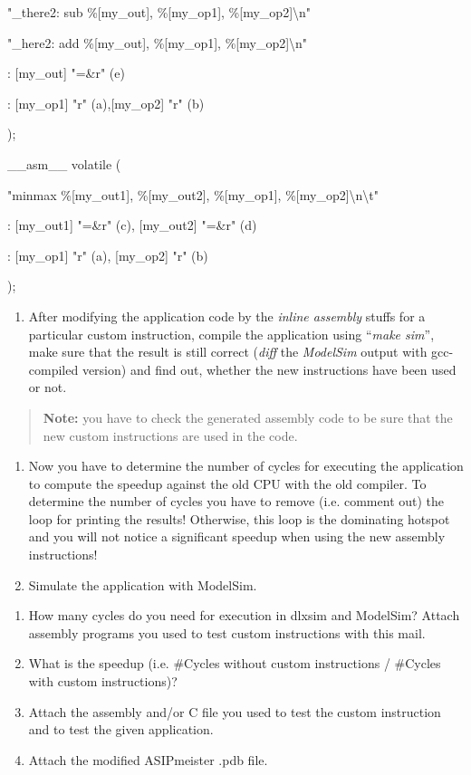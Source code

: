 \documentclass[
]{article}
\begin{document}
"\_there2: sub \%{[}my\_out{]}, \%{[}my\_op1{]},
\%{[}my\_op2{]}\textbackslash n"

"\_here2: add \%{[}my\_out{]}, \%{[}my\_op1{]},
\%{[}my\_op2{]}\textbackslash n"

: {[}my\_out{]} "=\&r" (e)

: {[}my\_op1{]} "r" (a),{[}my\_op2{]} "r" (b)

);

\_\_asm\_\_ volatile (

"minmax \%{[}my\_out1{]}, \%{[}my\_out2{]}, \%{[}my\_op1{]},
\%{[}my\_op2{]}\textbackslash n\textbackslash t"

: {[}my\_out1{]} "=\&r" (c), {[}my\_out2{]} "=\&r" (d)

: {[}my\_op1{]} "r" (a), {[}my\_op2{]} "r" (b)

);

\begin{enumerate}
\def\labelenumi{\arabic{enumi}.}
\setcounter{enumi}{3}
\item
  After modifying the application code by the \emph{inline assembly}
  stuffs for a particular custom instruction, compile the application
  using ``\emph{make sim}'', make sure that the result is still correct
  (\emph{diff} the \emph{ModelSim} output with gcc-compiled version) and
  find out, whether the new instructions have been used or not.
\end{enumerate}

\begin{quote}
\textbf{Note:} you have to check the generated assembly code to be sure
that the new custom instructions are used in the code.
\end{quote}

\begin{enumerate}
\def\labelenumi{\arabic{enumi}.}
\setcounter{enumi}{4}
\item
  Now you have to determine the number of cycles for executing the
  application to compute the speedup against the old CPU with the old
  compiler. {To determine the number of cycles you have to remove (i.e.
  comment out) the loop for printing the results}! Otherwise, this loop
  is the dominating hotspot and you will not notice a significant
  speedup when using the new assembly instructions!
\item
  Simulate the application with ModelSim.
\end{enumerate}

\begin{enumerate}
\def\labelenumi{\alph{enumi})}
\item
  How many cycles do you need for execution in dlxsim and ModelSim?
  Attach assembly programs you used to test custom instructions with
  this mail.
\item
  What is the speedup (i.e. \#Cycles without custom instructions /
  \#Cycles with custom instructions)?
\item
  Attach the assembly and/or C file you used to test the custom
  instruction and to test the given application.
\item
  Attach the modified ASIPmeister .pdb file.
\end{enumerate}
\end{document}

